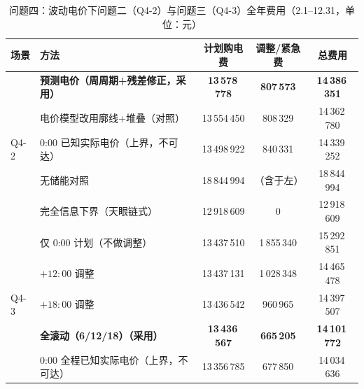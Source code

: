 \documentclass[12pt,a4paper,fontset=fandol]{ctexart}
\begin{document}
\begin{table}[htbp]
\centering
\caption{问题四\nobreak：波动电价下问题二（Q4-2\nobreak）与问题三（Q4-3\nobreak）全年费用（2.1--12.31\nobreak，单位\nobreak：元\nobreak）}
\label{tab:q4cmp}
\begin{tabular}{@{}llccc@{}}
\toprule
场景 & 方法 & 计划购电费 & 调整/紧急费 & 总费用 \\
\midrule
\multirow{5}{*}{Q4-2}
& \textbf{预测电价（周周期+残差修正\nobreak，采用\nobreak）} & \textbf{13\,578\,778} & \textbf{807\,573} & \textbf{14\,386\,351} \\
& 电价模型改用廓线+堆叠（对照\nobreak） & 13\,554\,450 & 808\,329 & 14\,362\,780 \\
& 0:00 已知实际电价（上界\nobreak，不可达\nobreak） & 13\,498\,922 & 840\,331 & 14\,339\,252 \\
& 无储能对照 & 18\,844\,994 & （含于左\nobreak） & 18\,844\,994 \\
& 完全信息下界（天眼链式\nobreak） & 12\,918\,609 & 0 & 12\,918\,609 \\
\midrule
\multirow{5}{*}{Q4-3}
& 仅 0:00 计划（不做调整\nobreak） & 13\,437\,510 & 1\,855\,340 & 15\,292\,851 \\
& $+12{:}00$ 调整 & 13\,437\,131 & 1\,028\,348 & 14\,465\,478 \\
& $+18{:}00$ 调整 & 13\,436\,542 & 960\,965 & 14\,397\,507 \\
& \textbf{全滚动（6/12/18\nobreak）（采用\nobreak）} & \textbf{13\,436\,567} & \textbf{665\,205} & \textbf{14\,101\,772} \\
& 0:00 全程已知实际电价（上界\nobreak，不可达\nobreak） & 13\,356\,785 & 677\,850 & 14\,034\,636 \\
\bottomrule
\end{tabular}
\end{table}
\end{document}
